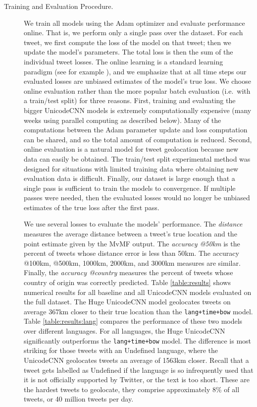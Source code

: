 \documentclass[sigconf,anonymous,review]{acmart}
\newcommand{\str}[1]{\texttt{#1}}
\newcommand{\defn}[1]{\textit{#1}}
\begin{document}
\begin{description}

\item[Training and Evaluation Procedure.]
We train all models using the Adam optimizer \citep{kingma2014adam} and evaluate performance online.
That is, we perform only a single pass over the dataset.
For each tweet, we first compute the loss of the model on that tweet;
then we update the model's parameters.
The total loss is then the sum of the individual tweet losses.
The online learning is a standard learning paradigm (see for example \citep{understandingml}),
and we emphasize that at all time steps our evaluated losses are unbiased estimates of the model's true loss.
We choose online evaluation rather than the more popular batch evaluation (i.e.\ with a train/test split) for three reasons.
First, training and evaluating the bigger UnicodeCNN models is extremely computationally expensive 
(many weeks using parallel computing as described below).
Many of the computations between the Adam parameter update and loss computation can be shared,
and so the total amount of computation is reduced.
Second, online evaluation is a natural model for tweet geolocation because new data can easily be obtained.
The train/test split experimental method was designed for situations with limited training data where obtaining new evaluation data is difficult.
Finally, our dataset is large enough that a single pass is sufficient to train the models to convergence.
If multiple passes were needed, then the evaluated losses would no longer be unbiased estimates of the true loss after the first pass.

We use several losses to evaluate the models' performance.
The \defn{distance} measures the average distance between a tweet's true location and the point estimate given by the MvMF output.
The \defn{accuracy @50km} is the percent of tweets whose distance error is less than 50km.
The {accuracy @100km, @500km, 1000km, 2000km, and 3000km} measures are similar.
Finally, the \defn{accuracy @country} measures the percent of tweets whose country of origin was correctly predicted.
Table \ref{table:results} shows numerical results for all baseline and all UnicodeCNN models evaluated on the full dataset.
The Huge UnicodeCNN model geolocates tweets on average 367km closer to their true location than the \str{lang+time+bow} model.
Table \ref{table:results:lang} compares the performance of these two models over different languages.
For all languages, the Huge UnicodeCNN significantly outperforms the \str{lang+time+bow} model.
The difference is most striking for those tweets with an Undefined language,
where the UnicodeCNN geolocates tweets an average of 1563km closer.
Recall that a tweet gets labelled as Undefined if the language is so infrequently used that it is not officially supported by Twitter,
or the text is too short.
These are the hardest tweets to geolocate,
they comprise approximately 8\% of all tweets,
or 40 million tweets per day.


\end{description}
\end{document}
